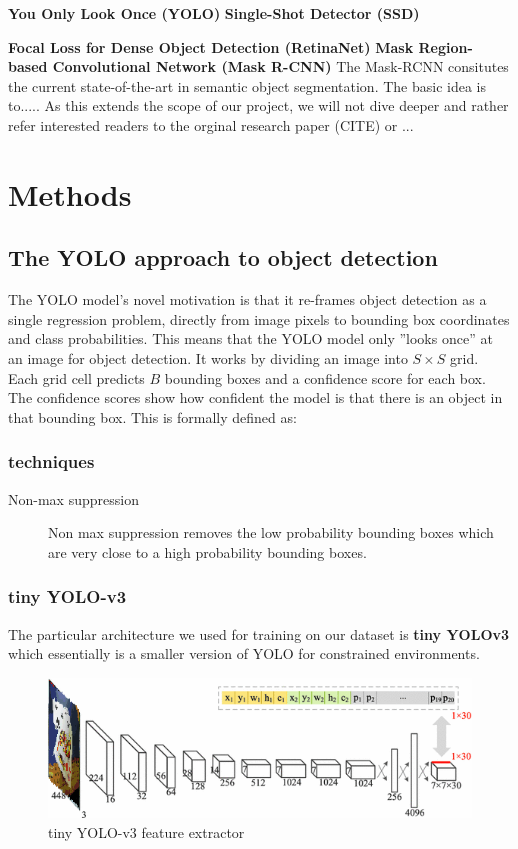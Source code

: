 \documentclass[a4paper]{article}
\begin{document}
\textbf{You Only Look Once (YOLO)}
\textbf{Single-Shot Detector (SSD)}

\textbf{Focal Loss for Dense Object Detection (RetinaNet)}
\textbf{Mask Region-based Convolutional Network (Mask R-CNN)}
The Mask-RCNN consitutes the current state-of-the-art in semantic object segmentation. The basic idea is to.....
As this extends the scope of our project, we will not dive deeper and rather refer interested readers to the orginal research paper (CITE) or ...
\section{Methods}
\subsection*{The YOLO approach to object detection}
The YOLO model’s novel motivation is that it re-frames
object detection as a single regression problem, directly
from image pixels to bounding box coordinates and class
probabilities. This means that the YOLO model only ”looks
once” at an image for object detection.
It works by dividing an image into $S\times S$ grid. Each grid
cell predicts $B$ bounding boxes and a confidence score for
each box. The confidence scores show how confident the
model is that there is an object in that bounding box. This
is formally defined as:

\subsubsection*{techniques}
\begin{description}
\item[Non-max suppression] Non max suppression removes the low probability bounding boxes which are very close to a high probability bounding boxes.
\end{description}

\subsubsection*{tiny YOLO-v3}

The particular architecture we used for training on our dataset is \textbf{tiny YOLOv3} which essentially is a smaller version of YOLO for constrained environments.
\begin{figure}


\includegraphics[width=1\linewidth]{tinyyolo}
\caption{tiny YOLO-v3 feature extractor}
\end{figure}
\end{document}
